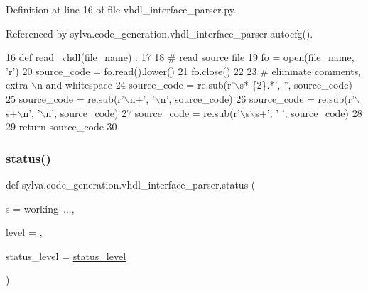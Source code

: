 Definition at line 16 of file vhdl\+\_\+interface\+\_\+parser.\+py.



Referenced by sylva.\+code\+\_\+generation.\+vhdl\+\_\+interface\+\_\+parser.\+autocfg().


\begin{DoxyCode}
16 \textcolor{keyword}{def }\hyperlink{namespacesylva_1_1code__generation_1_1vhdl__interface__parser_afc25f8fd1bfc69960af11938f1e9b305}{read\_vhdl}(file\_name) :
17 
18   \textcolor{comment}{# read source file}
19   fo = open(file\_name, \textcolor{stringliteral}{'r')}
20 \textcolor{stringliteral}{  source\_code = fo.read().lower()}
21 \textcolor{stringliteral}{  fo.close()}
22 \textcolor{stringliteral}{}
23 \textcolor{stringliteral}{  }\textcolor{comment}{# eliminate comments, extra \(\backslash\)n and whitespace}
24   source\_code = re.sub(\textcolor{stringliteral}{r'\(\backslash\)s*-\{2\}.*'}, \textcolor{stringliteral}{''}, source\_code)
25   source\_code = re.sub(\textcolor{stringliteral}{r'\(\backslash\)n+'}, \textcolor{stringliteral}{'\(\backslash\)n'}, source\_code)
26   source\_code = re.sub(\textcolor{stringliteral}{r'\(\backslash\)s+\(\backslash\)n'}, \textcolor{stringliteral}{'\(\backslash\)n'}, source\_code)
27   source\_code = re.sub(\textcolor{stringliteral}{r'\(\backslash\)s\(\backslash\)s+'}, \textcolor{stringliteral}{' '}, source\_code)
28 
29   \textcolor{keywordflow}{return} source\_code
30 
\end{DoxyCode}
\mbox{\label{namespacesylva_1_1code__generation_1_1vhdl__interface__parser_a531a0f0634e3fde1c48dc06c7c8c019f}} 
\subsubsection{\texorpdfstring{status()}{status()}}
{\footnotesize\ttfamily def sylva.\+code\+\_\+generation.\+vhdl\+\_\+interface\+\_\+parser.\+status (\begin{DoxyParamCaption}\item[{}]{s = {\ttfamily \textquotesingle{}working~...\textquotesingle{}},  }\item[{}]{level = {},  }\item[{}]{status\+\_\+level = {\ttfamily \hyperlink{namespacesylva_1_1code__generation_1_1vhdl__interface__parser_ab023ab99252ae045bf3ce5e948f363ae}{status\+\_\+level}} }\end{DoxyParamCaption})}



